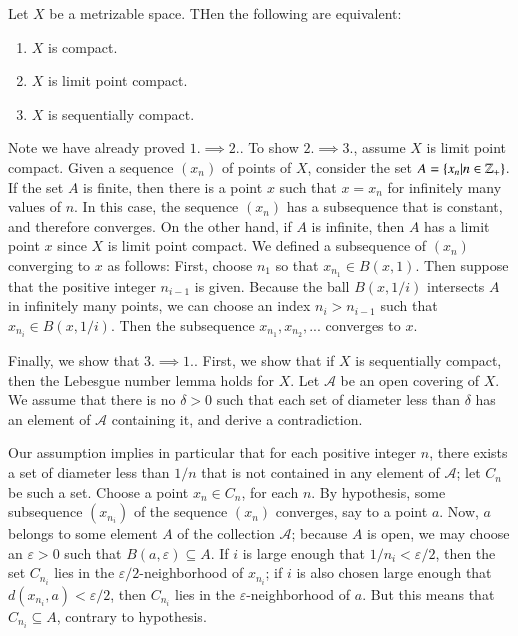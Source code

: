 \documentclass[12pt, a4paper, twoside, openright, titlepage]{book}
\begin{document}
\begin{thm}{}{}
    Let $X$ be a metrizable space. THen the following are equivalent: \begin{enumerate}
        \item $X$ is compact.
        \item $X$ is limit point compact.
        \item $X$ is sequentially compact.
    \end{enumerate}
\end{thm}
\begin{proof*}{}{}
    Note we have already proved $1.\implies 2.$. To show $2.\implies 3.$, assume $X$ is limit point compact. Given a sequence $(x_n)$ of points of $X$, consider the set $A = \{x_n\vert n \in \mathbb Z_+\}$. If the set $A$ is finite, then there is a point $x$ such that $x = x_n$ for infinitely many values of $n$. In this case, the sequence $(x_n)$ has a subsequence that is constant, and therefore converges. On the other hand, if $A$ is infinite, then $A$ has a limit point $x$ since $X$ is limit point compact. We defined a subsequence of $(x_n)$ converging to $x$ as follows: First, choose $n_1$ so that $x_{n_1} \in B(x,1)$. Then suppose that the positive integer $n_{i-1}$ is given. Because the ball $B(x,1/i)$ intersects $A$ in infinitely many points, we can choose an index $n_i > n_{i-1}$ such that $x_{n_i} \in B(x,1/i)$. Then the subsequence $x_{n_1},x_{n_2},...$ converges to $x$.


    Finally, we show that $3.\implies 1.$. First, we show that if $X$ is sequentially compact, then the Lebesgue number lemma holds for $X$. Let $\mathcal{A}$ be an open covering of $X$. We assume that there is no $\delta > 0$ such that each set of diameter less than $\delta$ has an element of $\mathcal{A}$ containing it, and derive a contradiction.


    Our assumption implies in particular that for each positive integer $n$, there exists a set of diameter less than $1/n$ that is not contained in any element of $\mathcal{A}$; let $C_n$ be such a set. Choose a point $x_n \in C_n$, for each $n$. By hypothesis, some subsequence $(x_{n_i})$ of the sequence $(x_n)$ converges, say to a point $a$. Now, $a$ belongs to some element $A$ of the collection $\mathcal{A}$; because $A$ is open, we may choose an $\varepsilon > 0$ such that $B(a,\varepsilon) \subseteq A$. If $i$ is large enough that $1/n_i < \varepsilon/2$, then the set $C_{n_i}$ lies in the $\varepsilon/2$-neighborhood of $x_{n_i}$; if $i$ is also chosen large enough that $d(x_{n_i},a) < \varepsilon/2$, then $C_{n_i}$ lies in the $\varepsilon$-neighborhood of $a$. But this means that $C_{n_i} \subseteq A$, contrary to hypothesis. 



\end{proof*}
\end{document}
